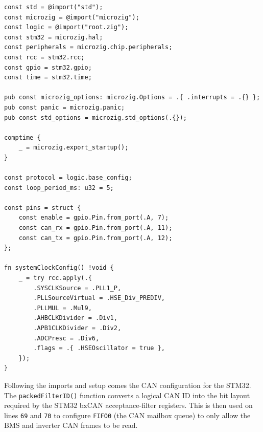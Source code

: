 \documentclass{article}
\begin{document}
\begin{lstlisting}[language=Zig]
const std = @import("std");
const microzig = @import("microzig");
const logic = @import("root.zig");
const stm32 = microzig.hal;
const peripherals = microzig.chip.peripherals;
const rcc = stm32.rcc;
const gpio = stm32.gpio;
const time = stm32.time;

pub const microzig_options: microzig.Options = .{ .interrupts = .{} };
pub const panic = microzig.panic;
pub const std_options = microzig.std_options(.{});

comptime {
    _ = microzig.export_startup();
}

const protocol = logic.base_config;
const loop_period_ms: u32 = 5;

const pins = struct {
    const enable = gpio.Pin.from_port(.A, 7);
    const can_rx = gpio.Pin.from_port(.A, 11);
    const can_tx = gpio.Pin.from_port(.A, 12);
};

fn systemClockConfig() !void {
    _ = try rcc.apply(.{
        .SYSCLKSource = .PLL1_P,
        .PLLSourceVirtual = .HSE_Div_PREDIV,
        .PLLMUL = .Mul9,
        .AHBCLKDivider = .Div1,
        .APB1CLKDivider = .Div2,
        .ADCPresc = .Div6,
        .flags = .{ .HSEOscillator = true },
    });
}
\end{lstlisting}

Following the imports and setup comes the CAN configuration for the STM32. The \texttt{packedFilterID()} function converts a logical CAN ID into the bit layout required by the STM32 bxCAN acceptance-filter registers. This is then used on lines \texttt{69} and \texttt{70} to configure \texttt{FIFO0} (the CAN mailbox queue) to only allow the BMS and inverter CAN frames to be read.
\end{document}
